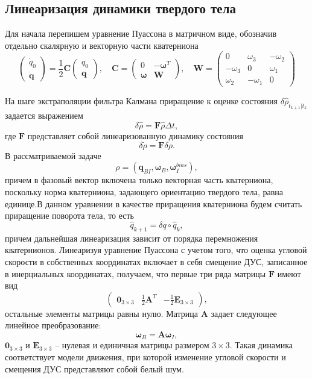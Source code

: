 \documentclass{article}
\begin{document}
\subsection{Линеаризация динамики твердого тела}
Для начала перепишем уравнение Пуассона в матричном виде, обозначив отдельно
скалярную и векторную части кватерниона
$$
\left(
\begin{array}{c}
    \dot{q}_0 \\
    \dot{\mathbf{q}}
\end{array}
\right) = \frac{1}{2}\mathbf{C}
\left(
\begin{array}{c}
    {q}_0 \\
    {\mathbf{q}}
\end{array}
\right),
\quad
\mathbf{C} = \left(\begin{array}{cc}
0 & -\mathbf{\omega}^T \\
\mathbf{\omega} & \mathbf{W} 
\end{array}\right), \quad
\mathbf{W} = \left(\begin{array}{rrr}
        0 & \omega_3 & -\omega_2 \\
        -\omega_3 & 0 & \omega_1 \\
        \omega_2 & -\omega_1 & 0
\end{array}\right)
$$

На шаге экстраполяции фильтра Калмана приращение к оценке состояния
$\delta\hat{\rho}_{t_{k+1}|t_k}$ задается выражением
$$
\delta\hat{\rho} = \mathbf{F}\hat{\rho}\Delta t,
$$
где $\mathbf{F}$ представляет собой линеаризованную динамику состояния
$$
\delta\dot{\rho} = \mathbf{F}\delta\rho.
$$
В рассматриваемой задаче
$$
\rho = \left(\mathbf{q}_{BI}, \mathbf{\omega}_B,
\mathbf{\omega}_I^{bias}\right),
$$
причем в фазовый вектор включена только векторная часть кватерниона, поскольку
норма кватерниона, задающего ориентацию твердого тела, равна единице.В данном
уравнении в качестве приращения кватерниона будем считать приращение поворота
тела, то есть
$$
\hat{q}_{k+1} = \delta q \circ \hat{q}_{k},
$$
причем дальнейшая линеаризация зависит от порядка перемножения кватернионов.
Линеаризуя уравнение Пуассона с учетом того, что оценка угловой скорости в
собственных координатах включает в себя смещение ДУС, записанное в
инерциальных координатах, получаем, что первые три ряда матрицы $\mathbf{F}$
имеют вид
$$
\left(\begin{array}{ccc}
        \mathbf{0}_{3\times 3} & \frac{1}{2}\mathbf{A}^T &
        -\frac{1}{2}\mathbf{E}_{3\times 3}
\end{array}\right),
$$
остальные элементы матрицы равны нулю.  Матрица $\mathbf{A}$ задает следующее
линейное  преобразование:
$$
\mathbf{\omega}_B = \mathbf{A}\mathbf{\omega}_I, 
$$
$\mathbf{0}_{3\times 3}$ и $\mathbf{E}_{3\times 3}$ -- нулевая и единичная
матрицы размером $3\times 3$. Такая динамика соответствует модели движения,
при которой изменение угловой скорости и смещения ДУС представляют собой белый
шум.
\end{document}
